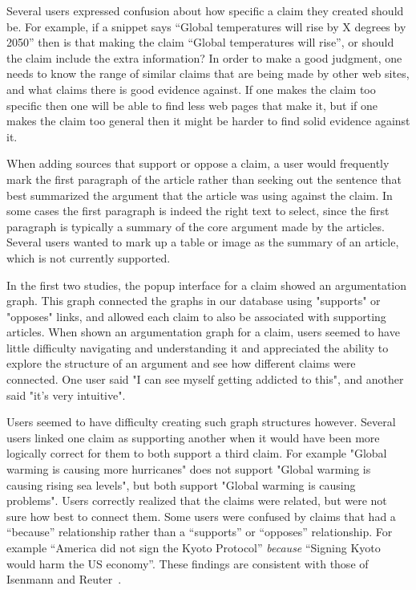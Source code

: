 \documentclass{www2010-submission}
\begin{document}
Several users expressed confusion about how specific a claim they created should be. For example, if a snippet says ``Global temperatures will rise by X degrees by 2050'' then is that making the claim ``Global temperatures will rise'', or should the claim include the extra information? In order to make a good judgment, one needs to know the range of similar claims that are being made by other web sites, and what claims there is good evidence against. If one makes the claim too specific then one will be able to find less web pages that make it, but if one makes the claim too general then it might be harder to find solid evidence against it.

When adding sources that support or oppose a claim, a user would frequently mark the first paragraph of the article rather than seeking out the sentence that best summarized the argument that the article was using against the claim. In some cases the first paragraph is indeed the right text to select, since the first paragraph is typically a summary of the core argument made by the articles. Several users wanted to mark up a table or image as the summary of an article, which is not currently supported.

In the first two studies, the popup interface for a claim showed an argumentation graph. This graph connected the graphs in our database using "supports" or "opposes" links, and allowed each claim to also be associated with supporting articles. When shown an argumentation graph for a claim, users seemed to have little difficulty navigating and understanding it and appreciated the ability to explore the structure of an argument and see how different claims were connected. One user said "I can see myself getting addicted to this", and another said "it's very intuitive".

Users seemed to have difficulty creating such graph structures however. Several users linked one claim as supporting another when it would have been more logically correct for them to both support a third claim. For example "Global warming is causing more hurricanes" does not support "Global warming is causing rising sea levels", but both support "Global warming is causing problems". Users correctly realized that the claims were related, but were not sure how best to connect them. Some users were confused by claims that had a ``because'' relationship rather than a ``supports'' or ``opposes'' relationship. For example ``America did not sign the Kyoto Protocol'' {\it because} ``Signing Kyoto would harm the US economy''. These findings are consistent with those of Isenmann and Reuter~\cite{Isenmann1997}.
\end{document}
